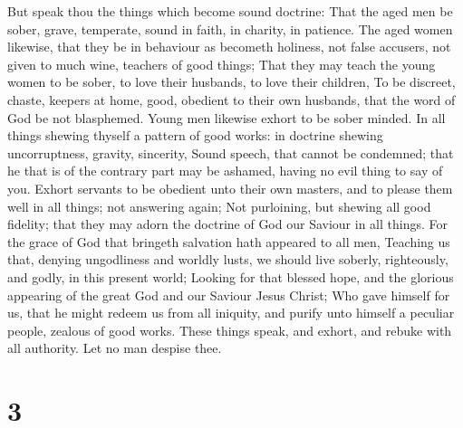  But speak thou the things which become sound doctrine:
 That the aged men be sober, grave, temperate, sound in
faith, in charity, in patience.  The aged women likewise,
that they be in behaviour as becometh holiness, not false accusers, not
given to much wine, teachers of good things;  That they may
teach the young women to be sober, to love their husbands, to love their
children,  To be discreet, chaste, keepers at home, good,
obedient to their own husbands, that the word of God be not blasphemed.
 Young men likewise exhort to be sober minded. 
In all things shewing thyself a pattern of good works: in doctrine
shewing uncorruptness, gravity, sincerity,  Sound speech,
that cannot be condemned; that he that is of the contrary part may be
ashamed, having no evil thing to say of you.  Exhort
servants to be obedient unto their own masters, and to please them well
in all things; not answering again;  Not purloining, but
shewing all good fidelity; that they may adorn the doctrine of God our
Saviour in all things.  For the grace of God that bringeth
salvation hath appeared to all men,  Teaching us that,
denying ungodliness and worldly lusts, we should live soberly,
righteously, and godly, in this present world;  Looking for
that blessed hope, and the glorious appearing of the great God and our
Saviour Jesus Christ;  Who gave himself for us, that he
might redeem us from all iniquity, and purify unto himself a peculiar
people, zealous of good works.  These things speak, and
exhort, and rebuke with all authority. Let no man despise thee.

\hypertarget{section-2}{%
\section{3}\label{section-2}}

